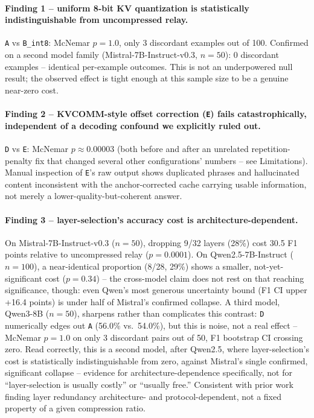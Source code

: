 \documentclass[11pt]{article}
\begin{document}
\paragraph{Finding 1 -- uniform 8-bit KV quantization is statistically
indistinguishable from uncompressed relay.} \texttt{A} vs \texttt{B\_int8}:
McNemar $p=1.0$, only 3 discordant examples out of 100. Confirmed on a
second model family (Mistral-7B-Instruct-v0.3, $n=50$): 0 discordant
examples -- identical per-example outcomes. This is not an underpowered
null result; the observed effect is tight enough at this sample size to be
a genuine near-zero cost.

\paragraph{Finding 2 -- KVCOMM-style offset correction (\texttt{E}) fails
catastrophically, independent of a decoding confound we explicitly ruled
out.} \texttt{D} vs \texttt{E}: McNemar $p\approx0.00003$ (both before and
after an unrelated repetition-penalty fix that changed several other
configurations' numbers -- see Limitations). Manual inspection of
\texttt{E}'s raw output shows duplicated phrases and hallucinated content
inconsistent with the anchor-corrected cache carrying usable information,
not merely a lower-quality-but-coherent answer.

\paragraph{Finding 3 -- layer-selection's accuracy cost is
architecture-dependent.} On Mistral-7B-Instruct-v0.3 ($n=50$), dropping
9/32 layers (28\%) cost 30.5 F1 points relative to uncompressed relay
($p=0.0001$). On Qwen2.5-7B-Instruct ($n=100$), a near-identical
proportion (8/28, 29\%) shows a smaller, not-yet-significant cost
($p=0.34$) -- the cross-model claim does not rest on that reaching
significance, though: even Qwen's most generous uncertainty bound (F1 CI
upper +16.4 points) is under half of Mistral's confirmed collapse. A
third model, Qwen3-8B ($n=50$), sharpens rather than complicates this
contrast: \texttt{D} numerically edges out \texttt{A} (56.0\% vs.\
54.0\%), but this is noise, not a real effect -- McNemar $p=1.0$ on only 3
discordant pairs out of 50, F1 bootstrap CI crossing zero. Read
correctly, this is a second model, after Qwen2.5, where layer-selection's
cost is statistically indistinguishable from zero, against Mistral's
single confirmed, significant collapse -- evidence for
architecture-dependence specifically, not for ``layer-selection is
usually costly'' or ``usually free.'' Consistent with prior work finding
layer redundancy architecture- and protocol-dependent, not a fixed
property of a given compression ratio.
\end{document}
